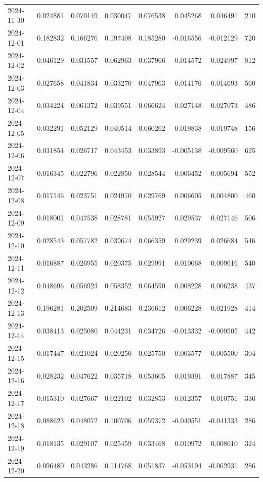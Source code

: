 \begin{tabular}{lrrrrrrr}
2024-11-30 & 0.024881 & 0.070149 & 0.030047 & 0.076538 & 0.045268 & 0.046491 & 210 \\
2024-12-01 & 0.182832 & 0.166276 & 0.197408 & 0.185280 & -0.016556 & -0.012129 & 720 \\
2024-12-02 & 0.046129 & 0.031557 & 0.062963 & 0.037966 & -0.014572 & -0.024997 & 812 \\
2024-12-03 & 0.027658 & 0.041834 & 0.033270 & 0.047963 & 0.014176 & 0.014693 & 560 \\
2024-12-04 & 0.034224 & 0.061372 & 0.039551 & 0.066624 & 0.027148 & 0.027073 & 486 \\
2024-12-05 & 0.032291 & 0.052129 & 0.040514 & 0.060262 & 0.019838 & 0.019748 & 156 \\
2024-12-06 & 0.031854 & 0.026717 & 0.043453 & 0.033893 & -0.005138 & -0.009560 & 625 \\
2024-12-07 & 0.016345 & 0.022796 & 0.022850 & 0.028544 & 0.006452 & 0.005694 & 552 \\
2024-12-08 & 0.017146 & 0.023751 & 0.024970 & 0.029769 & 0.006605 & 0.004800 & 460 \\
2024-12-09 & 0.018001 & 0.047538 & 0.028781 & 0.055927 & 0.029537 & 0.027146 & 506 \\
2024-12-10 & 0.028543 & 0.057782 & 0.039674 & 0.066359 & 0.029239 & 0.026684 & 546 \\
2024-12-11 & 0.016887 & 0.026955 & 0.020375 & 0.029991 & 0.010068 & 0.009616 & 540 \\
2024-12-12 & 0.048696 & 0.056923 & 0.058352 & 0.064590 & 0.008228 & 0.006238 & 437 \\
2024-12-13 & 0.196281 & 0.202509 & 0.214683 & 0.236612 & 0.006228 & 0.021928 & 414 \\
2024-12-14 & 0.038413 & 0.025080 & 0.044231 & 0.034726 & -0.013332 & -0.009505 & 442 \\
2024-12-15 & 0.017447 & 0.021024 & 0.020250 & 0.025750 & 0.003577 & 0.005500 & 304 \\
2024-12-16 & 0.028232 & 0.047622 & 0.035718 & 0.053605 & 0.019391 & 0.017887 & 345 \\
2024-12-17 & 0.015310 & 0.027667 & 0.022102 & 0.032853 & 0.012357 & 0.010751 & 336 \\
2024-12-18 & 0.088623 & 0.048072 & 0.100706 & 0.059372 & -0.040551 & -0.041333 & 286 \\
2024-12-19 & 0.018135 & 0.029107 & 0.025459 & 0.033468 & 0.010972 & 0.008010 & 324 \\
2024-12-20 & 0.096480 & 0.043286 & 0.114768 & 0.051837 & -0.053194 & -0.062931 & 286 \\

\end{tabular}
